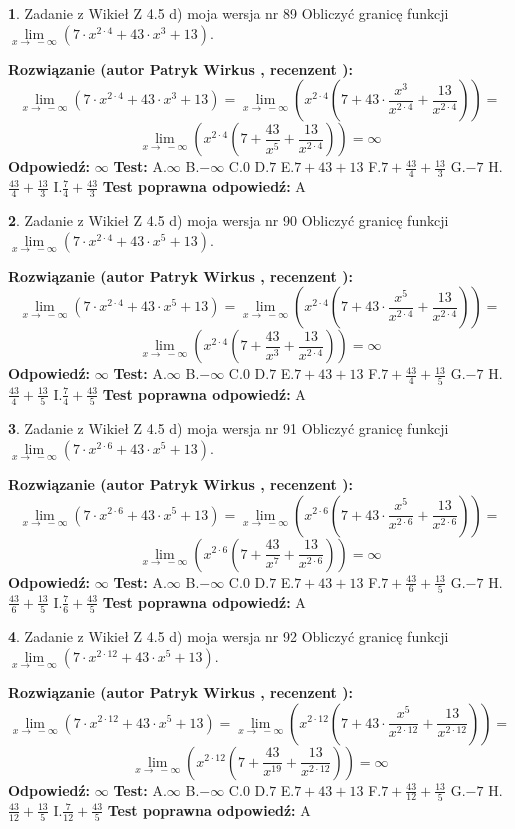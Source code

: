 \documentclass[12pt, a4paper]{article}
\theoremstyle{definition} %
\newtheorem{zad}{}
\newcommand{\zadStart}[1]{\begin{zad}#1\newline}
\newcommand{\zadStop}{\end{zad}}
\newcommand{\rozwStart}[2]{\noindent \textbf{Rozwiązanie (autor #1 , recenzent #2): }\newline}
\newcommand{\rozwStop}{\newline}
\newcommand{\odpStart}{\noindent \textbf{Odpowiedź:}\newline}
\newcommand{\odpStop}{\newline}
\newcommand{\testStart}{\noindent \textbf{Test:}\newline}
\newcommand{\testStop}{\newline}
\newcommand{\kluczStart}{\noindent \textbf{Test poprawna odpowiedź:}\newline}
\newcommand{\kluczStop}{\newline}
\begin{document}
\zadStart{Zadanie z Wikieł Z 4.5 d) moja wersja nr 89}
Obliczyć granicę funkcji  $\lim\limits_{x\to\ -\infty}(7 \cdot x^{2\cdot4}+43 \cdot x^{3}+13)$.
\zadStop
\rozwStart{Patryk Wirkus}{}
$$\lim\limits_{x\to\ -\infty}(7 \cdot x^{2\cdot4}+43 \cdot x^{3}+13) = \lim\limits_{x\to\ -\infty}(x^{2\cdot4}(7 +43 \cdot \frac{x^{3}}{x^{2\cdot4}}+\frac{13}{x^{2\cdot4}})) =$$ $$\lim\limits_{x\to\ -\infty}(x^{2\cdot4}(7 +\frac{43}{x^{5}}+\frac{13}{x^{2\cdot4}})) =\infty$$
\rozwStop
\odpStart
$\infty$
\odpStop
\testStart
A.$\infty$ B.$-\infty$ C.$0$ D.$7$ E.$7 + 43 + 13$
F.$7+\frac{43}{4}+\frac{13}{3}$ G.$-7$
H.$\frac{43}{4}+\frac{13}{3}$
I.$\frac{7}{4}+\frac{43}{3}$
\testStop
\kluczStart
A
\kluczStop



\zadStart{Zadanie z Wikieł Z 4.5 d) moja wersja nr 90}
Obliczyć granicę funkcji  $\lim\limits_{x\to\ -\infty}(7 \cdot x^{2\cdot4}+43 \cdot x^{5}+13)$.
\zadStop
\rozwStart{Patryk Wirkus}{}
$$\lim\limits_{x\to\ -\infty}(7 \cdot x^{2\cdot4}+43 \cdot x^{5}+13) = \lim\limits_{x\to\ -\infty}(x^{2\cdot4}(7 +43 \cdot \frac{x^{5}}{x^{2\cdot4}}+\frac{13}{x^{2\cdot4}})) =$$ $$\lim\limits_{x\to\ -\infty}(x^{2\cdot4}(7 +\frac{43}{x^{3}}+\frac{13}{x^{2\cdot4}})) =\infty$$
\rozwStop
\odpStart
$\infty$
\odpStop
\testStart
A.$\infty$ B.$-\infty$ C.$0$ D.$7$ E.$7 + 43 + 13$
F.$7+\frac{43}{4}+\frac{13}{5}$ G.$-7$
H.$\frac{43}{4}+\frac{13}{5}$
I.$\frac{7}{4}+\frac{43}{5}$
\testStop
\kluczStart
A
\kluczStop



\zadStart{Zadanie z Wikieł Z 4.5 d) moja wersja nr 91}
Obliczyć granicę funkcji  $\lim\limits_{x\to\ -\infty}(7 \cdot x^{2\cdot6}+43 \cdot x^{5}+13)$.
\zadStop
\rozwStart{Patryk Wirkus}{}
$$\lim\limits_{x\to\ -\infty}(7 \cdot x^{2\cdot6}+43 \cdot x^{5}+13) = \lim\limits_{x\to\ -\infty}(x^{2\cdot6}(7 +43 \cdot \frac{x^{5}}{x^{2\cdot6}}+\frac{13}{x^{2\cdot6}})) =$$ $$\lim\limits_{x\to\ -\infty}(x^{2\cdot6}(7 +\frac{43}{x^{7}}+\frac{13}{x^{2\cdot6}})) =\infty$$
\rozwStop
\odpStart
$\infty$
\odpStop
\testStart
A.$\infty$ B.$-\infty$ C.$0$ D.$7$ E.$7 + 43 + 13$
F.$7+\frac{43}{6}+\frac{13}{5}$ G.$-7$
H.$\frac{43}{6}+\frac{13}{5}$
I.$\frac{7}{6}+\frac{43}{5}$
\testStop
\kluczStart
A
\kluczStop



\zadStart{Zadanie z Wikieł Z 4.5 d) moja wersja nr 92}
Obliczyć granicę funkcji  $\lim\limits_{x\to\ -\infty}(7 \cdot x^{2\cdot12}+43 \cdot x^{5}+13)$.
\zadStop
\rozwStart{Patryk Wirkus}{}
$$\lim\limits_{x\to\ -\infty}(7 \cdot x^{2\cdot12}+43 \cdot x^{5}+13) = \lim\limits_{x\to\ -\infty}(x^{2\cdot12}(7 +43 \cdot \frac{x^{5}}{x^{2\cdot12}}+\frac{13}{x^{2\cdot12}})) =$$ $$\lim\limits_{x\to\ -\infty}(x^{2\cdot12}(7 +\frac{43}{x^{19}}+\frac{13}{x^{2\cdot12}})) =\infty$$
\rozwStop
\odpStart
$\infty$
\odpStop
\testStart
A.$\infty$ B.$-\infty$ C.$0$ D.$7$ E.$7 + 43 + 13$
F.$7+\frac{43}{12}+\frac{13}{5}$ G.$-7$
H.$\frac{43}{12}+\frac{13}{5}$
I.$\frac{7}{12}+\frac{43}{5}$
\testStop
\kluczStart
A
\kluczStop
\end{document}
